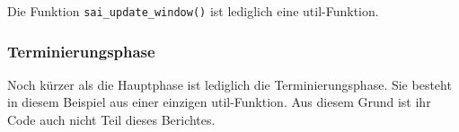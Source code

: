Die Funktion \texttt{sai\_update\_window()} ist lediglich eine util-Funktion.

\subsubsection{Terminierungsphase}
Noch kürzer als die Hauptphase ist lediglich die Terminierungsphase. Sie besteht in diesem Beispiel aus einer einzigen util-Funktion. Aus diesem Grund ist ihr Code auch nicht Teil dieses Berichtes.
